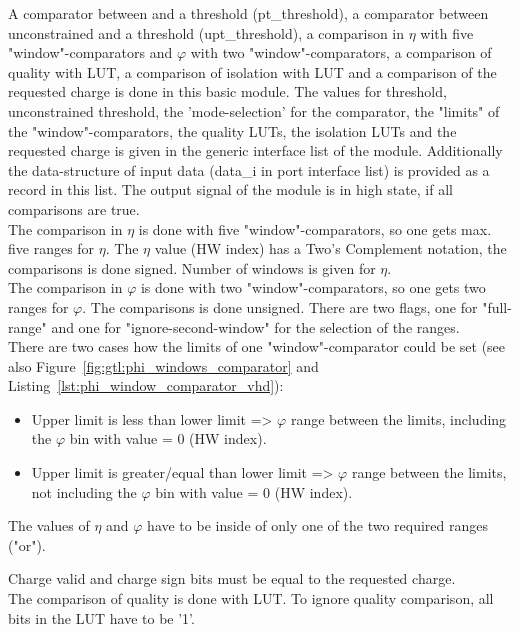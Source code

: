 A comparator between \pt and a threshold (pt\_threshold), a comparator between unconstrained \pt and a threshold (upt\_threshold), a comparison in $\eta$ with five "window"-comparators and $\varphi$ with two "window"-comparators, a comparison of quality with LUT, a comparison of isolation with LUT and a comparison of the requested charge is done in this basic module. The values for \pt threshold, unconstrained \pt threshold, the 'mode-selection' for the \pt comparator, the "limits" of the "window"-comparators, the quality LUTs, the isolation LUTs and the requested charge is given in the generic interface list of the module.
Additionally the data-structure of input data (data\_i in port interface list) is provided as a record in this list. The output signal of the module is in high state, if all comparisons are true.\\
The comparison in $\eta$ is done with five "window"-comparators, so one gets max. five ranges for $\eta$. The $\eta$ value (HW index) has a Two's Complement notation, the comparisons is done signed. Number of windows is given for $\eta$.\\
The comparison in $\varphi$ is done with two "window"-comparators, so one gets two ranges for $\varphi$. The comparisons is done unsigned. There are two flags, one for "full-range" and one for "ignore-second-window" for the selection of the ranges.\\
There are two cases how the limits of one "window"-comparator could be set (see also Figure~\ref{fig:gtl:phi_windows_comparator} and Listing~\ref{lst:phi_window_comparator_vhd}):
\begin{itemize}
\item Upper limit is less than lower limit => $\varphi$ range between the limits, including the $\varphi$ bin with value = 0 (HW index).
\item Upper limit is greater/equal than lower limit => $\varphi$ range between the limits, not including the $\varphi$ bin with value = 0 (HW index).
\end{itemize}

The values of $\eta$ and $\varphi$ have to be inside of only one of the two required ranges ("or").

Charge valid and charge sign bits must be equal to the requested charge.\\
The comparison of quality is done with LUT. To ignore quality comparison, all bits in the LUT have to be '1'.\\

